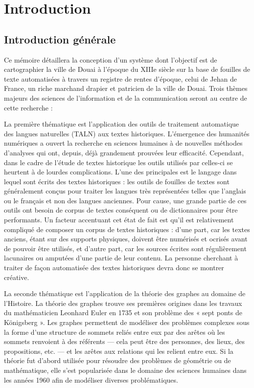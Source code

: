 \chapter{Introduction}
\section{Introduction générale}
 Ce mémoire détaillera la conception d’un système dont l’objectif est de cartographier la ville de Douai à l’époque du XIIIe siècle sur la base de fouilles de texte automatisées à travers un registre de rentes d'époque, celui de Jehan de France, un riche marchand drapier et patricien de la ville de Douai. Trois thèmes majeurs des sciences de l'information et de la communication seront au centre de cette recherche :
 
 La première thématique est l’application des outils de traitement automatique des langues naturelles (TALN) aux textes historiques. L’émergence des humanités numériques a ouvert la recherche en sciences humaines à de nouvelles méthodes d’analyses qui ont, depuis, déjà grandement prouvées leur efficacité. Cependant, dans le cadre de l’étude de textes historique les outils utilisés par celles-ci se heurtent à de lourdes complications. L’une des principales est le langage dans lequel sont écrits des textes historiques : les outils de fouilles de textes sont généralement conçus pour traiter les langues très représentées telles que l’anglais ou le français et non des langues anciennes. Pour cause, une grande partie de ces outils ont besoin de corpus de textes conséquent ou de dictionnaires pour être performants. Un facteur accentuant cet état de fait est qu’il est relativement compliqué de composer un corpus de textes historiques : d’une part, car les textes anciens, étant sur des supports physiques, doivent être numérisés et ocrisés avant de pouvoir être utilisés, et d’autre part, car les sources écrites sont régulièrement lacunaires ou amputées d’une partie de leur contenu. La personne cherchant à traiter de façon automatisée des textes historiques devra donc se montrer créative.
 
La seconde thématique est l’application de la théorie des graphes au domaine de l’Histoire. La théorie des graphes trouve ses premières origines dans les travaux du mathématicien Leonhard Euler en 1735 et son problème des « sept ponts de Königsberg ». Les graphes permettent de modéliser des problèmes complexes sous la forme d’une structure de sommets reliés entre eux par des arêtes où les sommets renvoient à des référents — cela peut être des personnes, des lieux, des propositions, etc. — et les arêtes aux relations qui les relient entre eux. Si la théorie fut d’abord utilisée pour résoudre des problèmes de géométrie ou de mathématique, elle s’est popularisée dans le domaine des sciences humaines dans les années 1960 afin de modéliser diverses problématiques.

